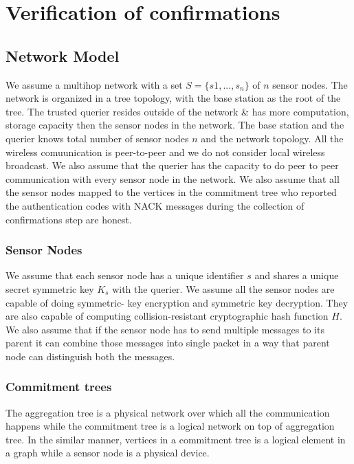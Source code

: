 \chapter{Verification of confirmations}

\section{Network Model}

We assume a multihop network with a set $ S = \{s1,...,s_{n}\} $ of $n$
sensor nodes. The network is organized in a tree topology, with the
base station as the root of the tree. The trusted querier resides
outside of the network \& has more computation, storage capacity 
then the sensor nodes in the network. The base station and the 
querier knows total number of sensor nodes $n$ and the network 
topology. All the wireless comuunication is peer-to-peer and we do 
not consider local wireless broadcast. We also assume that the
querier has the capacity to do peer to peer communication with 
every sensor node in the network. We also assume that all the sensor nodes 
mapped to the vertices in the commitment tree who reported the authentication 
codes with NACK messages during the collection of confirmations step are 
honest. 

\subsection{Sensor Nodes}

	We assume that each sensor node has a unique identifier $s$ and
	shares a unique secret symmetric key $K_{s}$ with the querier. 
	We assume all the sensor nodes are capable of doing symmetric-
	key encryption and symmetric key decryption. They are also
	capable of computing collision-resistant cryptographic hash 
	function $H$. We also assume that if the sensor node has to send 
	multiple messages to its parent it can combine those messages 
	into single packet in a way that parent node can distinguish both 
	the messages.

\subsection{Commitment trees} %
\label{sub:Commitment trees}
		
	The aggregation tree is a physical network over which all the
	communication happens while the commitment tree is a logical
	network on top of aggregation tree. In the similar manner, 
	vertices in a commitment tree is a logical element in a graph 
	while a sensor node is a physical device. 

